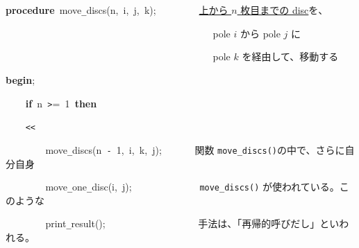 \documentclass[a4paper,10pt]{article}
\def\mc{\relax}
\begin{document}
\noindent
\mbox{}\textbf{procedure}{\tt\mc \ }move{\tt\_}discs(n,{\tt\mc \ }i,{\tt\mc \ }j,{\tt\mc \ }k);{\tt\mc \ }{\tt\mc \ }{\tt\mc \ }{\tt\mc \ }{\tt\mc \ }{\tt\mc \ }{\tt\mc \ }\rm\mc {\tt\%} \ \underline{\textsf{上から $n$ 枚目までの disc}}を、\hfill
\tt\mc 

\noindent
\mbox{}{\tt\mc \ }{\tt\mc \ }{\tt\mc \ }{\tt\mc \ }{\tt\mc \ }{\tt\mc \ }{\tt\mc \ }{\tt\mc \ }{\tt\mc \ }{\tt\mc \ }{\tt\mc \ }{\tt\mc \ }{\tt\mc \ }{\tt\mc \ }{\tt\mc \ }{\tt\mc \ }{\tt\mc \ }{\tt\mc \ }{\tt\mc \ }{\tt\mc \ }{\tt\mc \ }{\tt\mc \ }{\tt\mc \ }{\tt\mc \ }{\tt\mc \ }{\tt\mc \ }{\tt\mc \ }{\tt\mc \ }{\tt\mc \ }{\tt\mc \ }{\tt\mc \ }{\tt\mc \ }{\tt\mc \ }{\tt\mc \ }{\tt\mc \ }{\tt\mc \ }{\tt\mc \ }{\tt\mc \ }{\tt\mc \ }{\tt\mc \ }\rm\mc {\tt\%} \ pole $i$ から pole $j$ に\hfill
\tt\mc 

\noindent
\mbox{}{\tt\mc \ }{\tt\mc \ }{\tt\mc \ }{\tt\mc \ }{\tt\mc \ }{\tt\mc \ }{\tt\mc \ }{\tt\mc \ }{\tt\mc \ }{\tt\mc \ }{\tt\mc \ }{\tt\mc \ }{\tt\mc \ }{\tt\mc \ }{\tt\mc \ }{\tt\mc \ }{\tt\mc \ }{\tt\mc \ }{\tt\mc \ }{\tt\mc \ }{\tt\mc \ }{\tt\mc \ }{\tt\mc \ }{\tt\mc \ }{\tt\mc \ }{\tt\mc \ }{\tt\mc \ }{\tt\mc \ }{\tt\mc \ }{\tt\mc \ }{\tt\mc \ }{\tt\mc \ }{\tt\mc \ }{\tt\mc \ }{\tt\mc \ }{\tt\mc \ }{\tt\mc \ }{\tt\mc \ }{\tt\mc \ }{\tt\mc \ }\rm\mc {\tt\%} \ pole $k$ を経由して、移動する\hfill
\tt\mc 

\noindent
\mbox{}\textbf{begin};

\noindent
\mbox{}{\tt\mc \ }{\tt\mc \ }{\tt\mc \ }{\tt\mc \ }\textbf{if}{\tt\mc \ }n{\tt\mc \ }{\tt >}={\tt\mc \ }1{\tt\mc \ }\textbf{then}

\noindent
\mbox{}{\tt\mc \ }{\tt\mc \ }{\tt\mc \ }{\tt\mc \ }{\tt <}{\tt <}

\noindent
\mbox{}{\tt\mc \ }{\tt\mc \ }{\tt\mc \ }{\tt\mc \ }{\tt\mc \ }{\tt\mc \ }{\tt\mc \ }{\tt\mc \ }move{\tt\_}discs(n{\tt\mc \ }{\tt -}{\tt\mc \ }1,{\tt\mc \ }i,{\tt\mc \ }k,{\tt\mc \ }j);{\tt\mc \ }{\tt\mc \ }{\tt\mc \ }{\tt\mc \ }{\tt\mc \ }\rm\mc {\tt\%} \ 関数 {\tt move\_discs()}の中で、さらに自分自身 \hfill
\tt\mc 

\noindent
\mbox{}{\tt\mc \ }{\tt\mc \ }{\tt\mc \ }{\tt\mc \ }{\tt\mc \ }{\tt\mc \ }{\tt\mc \ }{\tt\mc \ }move{\tt\_}one{\tt\_}disc(i,{\tt\mc \ }j);{\tt\mc \ }{\tt\mc \ }{\tt\mc \ }{\tt\mc \ }{\tt\mc \ }{\tt\mc \ }{\tt\mc \ }{\tt\mc \ }{\tt\mc \ }{\tt\mc \ }{\tt\mc \ }{\tt\mc \ }\rm\mc {\tt\%} \ {\tt move\_discs()} が使われている。このような \hfill
\tt\mc 

\noindent
\mbox{}{\tt\mc \ }{\tt\mc \ }{\tt\mc \ }{\tt\mc \ }{\tt\mc \ }{\tt\mc \ }{\tt\mc \ }{\tt\mc \ }print{\tt\_}result();{\tt\mc \ }{\tt\mc \ }{\tt\mc \ }{\tt\mc \ }{\tt\mc \ }{\tt\mc \ }{\tt\mc \ }{\tt\mc \ }{\tt\mc \ }{\tt\mc \ }{\tt\mc \ }{\tt\mc \ }{\tt\mc \ }{\tt\mc \ }{\tt\mc \ }{\tt\mc \ }{\tt\mc \ }\rm\mc {\tt\%} \ 手法は、「再帰的呼びだし」といわれる。 \hfill
\tt\mc 
\end{document}
